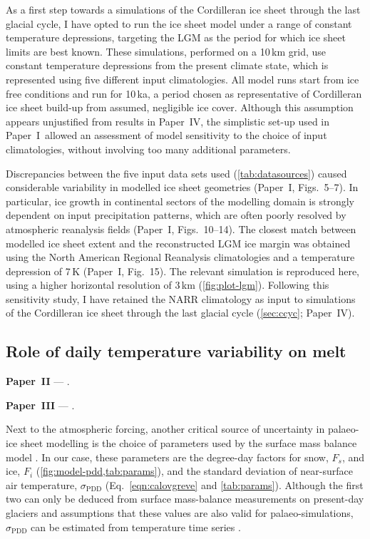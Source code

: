 \documentclass[a4paper]{kappa}
\newcommand{\sPDD}[0]{\sigma_{\mathrm{PDD}}}
\newcommand{\CCLI}[0]{Paper~I}      %
\newcommand{\PSDV}[0]{Paper~II}     %
\newcommand{\PSDP}[0]{Paper~III}    %
\newcommand{\CCYC}[0]{Paper~IV}     %
\begin{document}
As a first step towards a simulations of the Cordilleran ice sheet through the
last glacial cycle, I have opted to run the ice sheet model under a range of
constant temperature depressions, targeting the LGM as the period for which ice
sheet limits are best known. These simulations,
performed on a 10\,km grid, use constant temperature depressions
from the present climate state, which is represented using five different input
climatologies. All model runs start
from ice free conditions and run for 10\,ka, a period chosen as representative
of Cordilleran ice sheet build-up from assumed, negligible ice cover. Although
this assumption appears unjustified from results in \CCYC, the simplistic
set-up used in \CCLI\ allowed an assessment of model sensitivity to the choice
of input climatologies, without involving too many additional parameters.

Discrepancies between the five input data sets used (\cref{tab:datasources})
caused considerable variability in modelled ice sheet geometries (\CCLI,
Figs.~5--7). In particular, ice growth in continental sectors of the modelling
domain is strongly dependent on input precipitation patterns, which are often
poorly resolved by atmospheric reanalysis fields
(\CCLI, Figs.~10--14). The closest match between modelled ice sheet extent and
the reconstructed LGM ice margin \citep{Dyke.2004} was obtained using the North
American Regional Reanalysis \citep[NARR,][]{Mesinger.etal.2006} climatologies
and a temperature depression of 7\,K (\CCLI, Fig.~15). The relevant simulation
is reproduced here, using a higher horizontal resolution of 3\,km
(\cref{fig:plot-lgm}). Following this sensitivity study, I have retained the
NARR climatology as input to simulations of the Cordilleran ice sheet through
the last glacial cycle (\cref{sec:ccyc}; \CCYC).


\subsection{Role of daily temperature variability on melt}

\noindent\textbf{\PSDV} --- .
\bigskip

\noindent\textbf{\PSDP} --- .
\bigskip

Next to the atmospheric forcing, another critical source of uncertainty in
palaeo-ice sheet modelling is the choice of parameters used by the surface mass
balance model \citep[e.g.,][]{Hebeler.etal.2008}. In our case, these parameters
are the degree-day factors for snow, $F_s$, and ice, $F_i$
(\cref{fig:model-pdd,tab:params}), and the standard deviation of
near-surface air temperature, $\sPDD$ (Eq.~\ref{eqn:calovgreve} and
\cref{tab:params}). Although the first two can only be
deduced from surface mass-balance measurements on present-day glaciers
\citep[e.g.,][]{Shea.etal.2009} and assumptions that these values are also
valid for palaeo-simulations, $\sPDD$ can be estimated from temperature time
series \citep[e.g.,][]{Fausto.etal.2011}.
\end{document}
